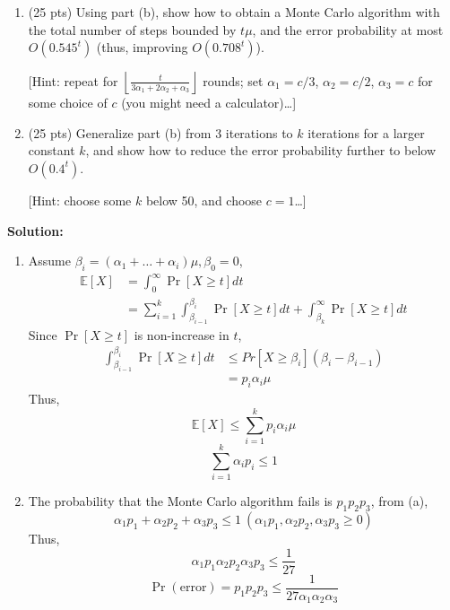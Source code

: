 \documentclass[11pt]{article}
\newcommand{\down}[1]{\left\lfloor #1\right\rfloor}
\begin{document}
\begin{description}
\begin{enumerate}

\smallskip
\item[(c)] (25 pts) Using part (b), show how to obtain a Monte Carlo algorithm with
the total number of steps bounded by $t\mu$, and the error probability 
at most $O(0.545^t)$ (thus, improving $O(0.708^t)$).

[Hint: repeat for 
$\down{\frac{t}{3\alpha_1 + 2\alpha_2 + \alpha_3}}$ rounds; set $\alpha_1=c/3$, $\alpha_2=c/2$, $\alpha_3=c$ for some choice of $c$ (you might need a calculator)\ldots]

\smallskip
\item[(d)] (25 pts) Generalize part (b) from 3 iterations to $k$ iterations for a larger constant $k$, and show how to reduce the error probability further to below $O(0.4^t)$.

[Hint: choose some $k$ below 50, and choose $c=1$\ldots]
\end{enumerate}


\newpage
\textbf{Solution:}
\begin{enumerate}
  \item[(a)] Assume $\beta_i = (\alpha_1+\ldots+\alpha_i)\mu, \beta_0 = 0$,
  \begin{align*}
  \mathbb{E}[X] 
  &= \int_{0}^{\infty}\Pr[X\ge t] dt \\
  &= \sum_{i=1}^{k} \int_{\beta_{i-1}}^{\beta_{i}} \Pr[X\ge t]dt 
  + \int_{\beta_k}^{\infty} \Pr[X\ge t]dt
  \end{align*}
  Since $\Pr[X\ge t]$ is non-increase in $t$,
  \begin{align*}
  \int_{\beta_{i-1}}^{\beta_i} \Pr[X\ge t]dt 
  &\le Pr[X\ge \beta_i](\beta_i - \beta_{i-1}) \\
  &= p_i\alpha_i\mu
  \end{align*}
  Thus,
  \[
  \mathbb{E}[X] \le \sum_{i=1}^{k} p_i\alpha_i\mu
  \]\[
  \sum_{i=1}^{k} \alpha_i p_i \le 1
  \]

  \item[(b)] The probability that the Monte Carlo algorithm fails is 
  $p_1 p_2 p_3$, from (a),
  \[
  \alpha_1p_1 + \alpha_2p_2 + \alpha_3p_3 \le 1 \ 
  (\alpha_1p_1, \alpha_2p_2, \alpha_3p_3 \ge 0)
  \]
  Thus,
  \[
  \alpha_1p_1\alpha_2p_2\alpha_3p_3 \le \frac{1}{27}
  \]\[
  \Pr(\text{error}) = p_1 p_2 p_3 \le \frac{1}{27\alpha_1\alpha_2\alpha_3}
  \]


\end{enumerate}
\end{description}
\end{document}
